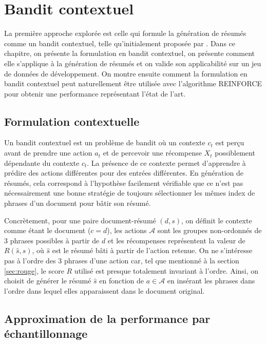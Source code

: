 \chapter{Bandit contextuel}
\label{chap:bandit_contextuel}

La première approche explorée est celle qui formule la génération de
résumés comme un bandit contextuel, telle qu'initialement proposée par \citep{dong2018banditsum}.
Dans ce chapitre, on présente la formulation en bandit contextuel, on présente 
comment elle s'applique à la génération de résumés et on valide son applicabilité 
sur un jeu de données de développement.
On montre ensuite comment la formulation en bandit contextuel peut
naturellement être utilisée avec l'algorithme REINFORCE \cite{williams1992simple}
pour obtenir une performance représentant l'état de l'art.

\section{Formulation contextuelle}

Un bandit contextuel est un problème de bandit où un contexte $c_t$ est perçu
avant de prendre une action $a_t$ et de percevoir une récompense $X_t$
possiblement dépendante du contexte $c_t$.
La présence de ce contexte permet d'apprendre à prédire des actions différentes
pour des entrées différentes.
En génération de résumés, cela correspond à l'hypothèse facilement vérifiable
que ce n'est pas nécessairement une bonne stratégie de toujours sélectionner
les mêmes index de phrases d'un document pour bâtir son résumé.

Concrètement, pour une paire document-résumé $(d, s)$, on définit le contexte
comme étant le document ($c=d$), les actions $\mathcal{A}$ sont les groupes non-ordonnés de 3 phrases
possibles à partir de $d$ et les récompenses représentent la valeur de $R(\hat{s}, s)$,
où $\hat{s}$ est le résumé bâti à partir de l'action retenue.
On ne s'intéresse pas à l'ordre des 3 phrases d'une action car, tel que mentionné
à la section \ref{sec:rouge}, le score $R$ utilisé est presque totalement invariant à l'ordre.
Ainsi, on choisit de générer le résumé $\hat{s}$ en fonction de $a \in \mathcal{A}$ en insérant les phrases
dans l'ordre dans lequel elles apparaissent dans le document original.


\section{Approximation de la performance par échantillonnage}

